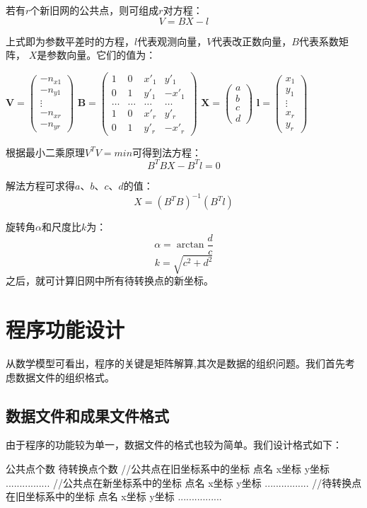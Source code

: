 若有$r$个新旧网的公共点，则可组成$r$对方程：
$$V=BX-l$$

上式即为参数平差时的方程，$l$代表观测向量，$V$代表改正数向量，$B$代表系数矩阵，
$X$是参数向量。它们的值为：

$\mathbf{V}=
\left(\begin{array}{c}
-n_{x1} \\ -n_{y1} \\ \vdots \\ -n_{xr} \\ -n_{yr}
\end{array}\right)$
$\mathbf{B}=
\left(\begin{array}{cccc}
1 & 0 & x'_1 & y'_1 \\
0 & 1 & y'_1 & -x'_1 \\
\dots & \dots & \ldots & \ldots \\
1 & 0 & x'_r & y'_r \\
0 & 1 & y'_r & -x'_r
\end{array}\right)$
$\mathbf{X}=
\left(\begin{array}{c}
a \\ b \\ c \\ d
\end{array}\right)$
$\mathbf{l}=
\left(\begin{array}{c}
x_1 \\ y_1 \\ \vdots \\ x_r \\ y_r
\end{array}\right)$

根据最小二乘原理$V^TV=min$可得到法方程：
$$B^TBX-B^Tl=0$$

解法方程可求得$a$、$b$、$c$、$d$的值：
$$X=(B^TB)^{-1}(B^Tl)$$

旋转角$\alpha$和尺度比$k$为：
$$\alpha=\arctan\frac{d}{c}$$
$$k=\sqrt{c^2+d^2}$$
之后，就可计算旧网中所有待转换点的新坐标。

\section{程序功能设计}
从数学模型可看出，程序的关键是矩阵解算,其次是数据的组织问题。我们首先考虑数据文件的组织格式。

\subsection{数据文件和成果文件格式}
由于程序的功能较为单一，数据文件的格式也较为简单。我们设计格式如下：
\begin{verbatim*}
公共点个数
待转换点个数
//公共点在旧坐标系中的坐标
点名 x坐标 y坐标
................
//公共点在新坐标系中的坐标
点名 x坐标 y坐标
................
//待转换点在旧坐标系中的坐标
点名 x坐标 y坐标
................
\end{verbatim*}

